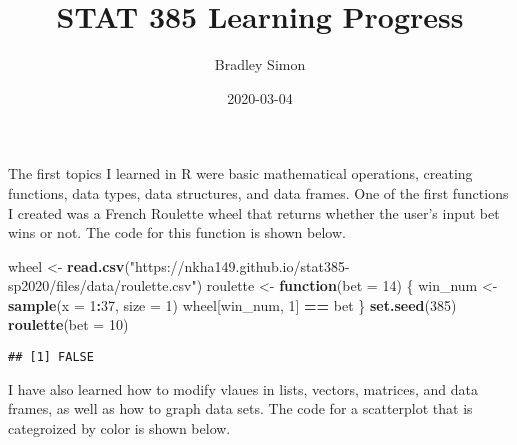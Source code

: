 \documentclass[]{article}
\title{STAT 385 Learning Progress}
\author{Bradley Simon}
\date{2020-03-04}
\newenvironment{Shaded}{\begin{snugshade}}{\end{snugshade}}
\newcommand{\ControlFlowTok}[1]{\textcolor[rgb]{0.13,0.29,0.53}{\textbf{#1}}}
\newcommand{\DataTypeTok}[1]{\textcolor[rgb]{0.13,0.29,0.53}{#1}}
\newcommand{\DecValTok}[1]{\textcolor[rgb]{0.00,0.00,0.81}{#1}}
\newcommand{\KeywordTok}[1]{\textcolor[rgb]{0.13,0.29,0.53}{\textbf{#1}}}
\newcommand{\NormalTok}[1]{#1}
\newcommand{\OperatorTok}[1]{\textcolor[rgb]{0.81,0.36,0.00}{\textbf{#1}}}
\newcommand{\StringTok}[1]{\textcolor[rgb]{0.31,0.60,0.02}{#1}}
\begin{document}
\maketitle

The first topics I learned in R were basic mathematical operations,
creating functions, data types, data structures, and data frames. One of
the first functions I created was a French Roulette wheel that returns
whether the user's input bet wins or not. The code for this function is
shown below.

\begin{Shaded}
\begin{Highlighting}[]
\NormalTok{wheel <-}\StringTok{ }\KeywordTok{read.csv}\NormalTok{(}\StringTok{"https://nkha149.github.io/stat385-sp2020/files/data/roulette.csv"}\NormalTok{)}
\NormalTok{roulette <-}\StringTok{ }\ControlFlowTok{function}\NormalTok{(}\DataTypeTok{bet =} \DecValTok{14}\NormalTok{) \{}
\NormalTok{  win_num <-}\StringTok{ }\KeywordTok{sample}\NormalTok{(}\DataTypeTok{x =} \DecValTok{1}\OperatorTok{:}\DecValTok{37}\NormalTok{, }\DataTypeTok{size =} \DecValTok{1}\NormalTok{)}
\NormalTok{  wheel[win_num, }\DecValTok{1}\NormalTok{] }\OperatorTok{==}\StringTok{ }\NormalTok{bet}
\NormalTok{\}}
\KeywordTok{set.seed}\NormalTok{(}\DecValTok{385}\NormalTok{)}
\KeywordTok{roulette}\NormalTok{(}\DataTypeTok{bet =} \DecValTok{10}\NormalTok{)}
\end{Highlighting}
\end{Shaded}

\begin{verbatim}
## [1] FALSE
\end{verbatim}

I have also learned how to modify vlaues in lists, vectors, matrices,
and data frames, as well as how to graph data sets. The code for a
scatterplot that is categroized by color is shown below.

\begin{Shaded}
\end{Shaded}
\end{document}
